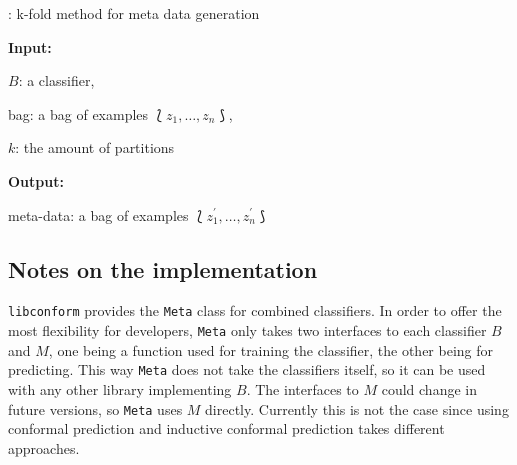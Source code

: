 \documentclass[twoside,11pt]{article}
\def\libconform{\texttt{libconform}}
\begin{document}
\begin{algorithm}
  \caption{: k-fold method for meta data generation}
  \label{alg:kfoldmeta}

  \textbf{Input:}

  \quad $B$: a classifier,

  \quad bag: a bag of examples $\Lbag z_1,\dots,z_n \Rbag$,

  \quad $k$: the amount of partitions

  \textbf{Output:}

  \quad meta-data: a bag of examples
    $\Lbag z^{\prime}_1,\dots,z^{\prime}_n \Rbag$

  \begin{algorithmic}[1]
      \ENDFOR
    \ENDFOR
  \end{algorithmic}
\end{algorithm}

\subsection*{Notes on the implementation}

\libconform{} provides the \texttt{Meta} class for
combined classifiers. In order to offer the most
flexibility for developers, \texttt{Meta} only takes two
interfaces to each classifier $B$ and $M$, one being a
function used for training the classifier, the other being
for predicting. This way \texttt{Meta} does not take the
classifiers itself, so it can be used with any other
library implementing $B$. The interfaces to $M$ could
change in future versions, so \texttt{Meta} uses $M$
directly. Currently this is not the case since using
conformal prediction and inductive conformal prediction
takes different approaches.
\end{document}
